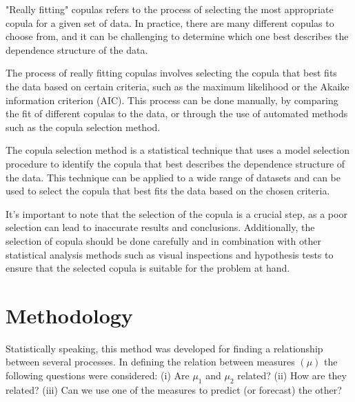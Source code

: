 \documentclass[12pt]{article} %
\theoremstyle{plain}
\begin{document}
	
	"Really fitting" copulas refers to the process of selecting the most appropriate copula for a given set of data. In practice, there are many different copulas to choose from, and it can be challenging to determine which one best describes the dependence structure of the data.
	
	The process of really fitting copulas involves selecting the copula that best fits the data based on certain criteria, such as the maximum likelihood or the Akaike information criterion (AIC). This process can be done manually, by comparing the fit of different copulas to the data, or through the use of automated methods such as the copula selection method.
	
	The copula selection method is a statistical technique that uses a model selection procedure to identify the copula that best describes the dependence structure of the data. This technique can be applied to a wide range of datasets and can be used to select the copula that best fits the data based on the chosen criteria.
	
	It's important to note that the selection of the copula is a crucial step, as a poor selection can lead to inaccurate results and conclusions. Additionally, the selection of copula should be done carefully and in combination with other statistical analysis methods such as visual inspections and hypothesis tests to ensure that the selected copula is suitable for the problem at hand.

	
	
	\section{Methodology}
	
	\label{sec:est}
	
	Statistically speaking, this method was developed for finding a relationship between several processes. In defining the relation between measures $(\mu)$ the following questions were considered: (i) Are $\mu_1$ and $\mu_2$ related? (ii) How are they related? (iii) Can we use one of the measures to predict (or forecast) the other?
	
\end{document}
